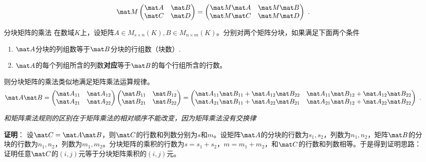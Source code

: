 \begin{equation}
\mat M
\begin{pmatrix}
\mat A & \mat B\\
\mat C & \mat D\\
\end{pmatrix}
=
\begin{pmatrix}
\mat M \mat A & \mat M \mat B\\
\mat M \mat C & \mat M \mat D\\
\end{pmatrix}~.
\end{equation}


\begin{theorem}{分块矩阵的乘法}
在数域$K$上，设矩阵$A\in{M_{s\times{n}}(K)},B\in{M_{n\times{m}}(K)}$。分别对两个矩阵分块，如果满足下面两个条件
\begin{enumerate}
\item $\mat A$分块的列组数等于$\mat B$分块的行组数（块数）.
\item $\mat A$的每个列组所含的列数\textbf{对应}等于$\mat B$的每个行组所含的行数。
\end{enumerate}
则分块矩阵的乘法类似地满足矩阵乘法运算规律。
\begin{equation}
\mat A\mat B=
\begin{pmatrix}
\mat A_{11} & \mat A_{12}\\
\mat A_{21} & \mat A_{22}
\end{pmatrix}
\begin{pmatrix}
\mat B_{11} & \mat B_{12}\\
\mat B_{21} & \mat B_{22}
\end{pmatrix}
=
\begin{pmatrix}
\mat A_{11}\mat B_{11}+\mat A_{12}\mat B_{22} & \mat A_{11}\mat B_{12}+\mat A_{12}\mat B_{22}\\
\mat A_{21}\mat B_{11}+\mat A_{22}\mat B_{21} & \mat A_{21}\mat B_{12}+\mat A_{22}\mat B_{22}
\end{pmatrix}~.
\end{equation}
\end{theorem}
\textsl{和矩阵乘法规则的区别在于矩阵乘法的相对顺序不能改变，因为矩阵乘法没有交换律}

\textbf{证明}：
设$\mat C=\mat A\mat B$，则$\mat C$的行数和列数分别为$s$和$m$。设矩阵$\mat A$的分块的行数为$s_1,s_2$，列数为$n_1,n_2$，矩阵$\mat B$的分块的行数为$n_1,n_2$，列数为$m_1,m_2$。分块矩阵的乘积的行数为$s=s_1+s_2$，$m=m_1+m_2$，和$\mat C$的行数和列数相等。于是得到证明思路：证明任意$\mat C$的$(i,j)$元等于分块矩阵乘积的$(i,j)$元。

